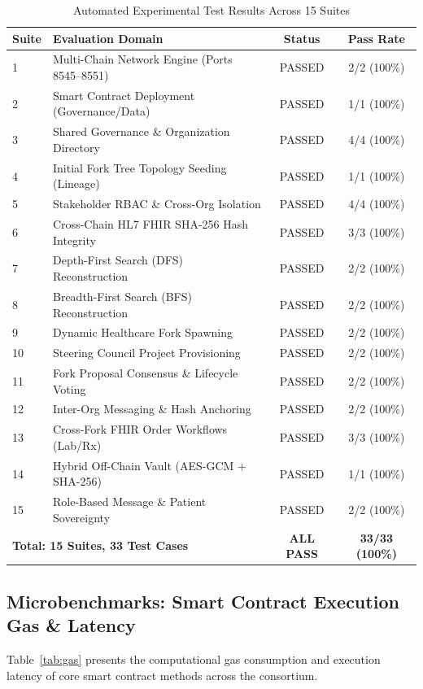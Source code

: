\documentclass[journal]{IEEEtran}
\theoremstyle{definition}
\begin{document}
\begin{table}[htbp]
\centering
\caption{Automated Experimental Test Results Across 15 Suites}
\label{tab:eval}
\begin{tabular}{llcc}
\toprule
\textbf{Suite} & \textbf{Evaluation Domain} & \textbf{Status} & \textbf{Pass Rate} \\
\midrule
1  & Multi-Chain Network Engine (Ports 8545--8551) & PASSED & 2/2 (100\%) \\
2  & Smart Contract Deployment (Governance/Data)   & PASSED & 1/1 (100\%) \\
3  & Shared Governance \& Organization Directory   & PASSED & 4/4 (100\%) \\
4  & Initial Fork Tree Topology Seeding (Lineage)  & PASSED & 1/1 (100\%) \\
5  & Stakeholder RBAC \& Cross-Org Isolation       & PASSED & 4/4 (100\%) \\
6  & Cross-Chain HL7 FHIR SHA-256 Hash Integrity   & PASSED & 3/3 (100\%) \\
7  & Depth-First Search (DFS) Reconstruction       & PASSED & 2/2 (100\%) \\
8  & Breadth-First Search (BFS) Reconstruction     & PASSED & 2/2 (100\%) \\
9  & Dynamic Healthcare Fork Spawning              & PASSED & 2/2 (100\%) \\
10 & Steering Council Project Provisioning          & PASSED & 2/2 (100\%) \\
11 & Fork Proposal Consensus \& Lifecycle Voting   & PASSED & 2/2 (100\%) \\
12 & Inter-Org Messaging \& Hash Anchoring         & PASSED & 2/2 (100\%) \\
13 & Cross-Fork FHIR Order Workflows (Lab/Rx)      & PASSED & 3/3 (100\%) \\
14 & Hybrid Off-Chain Vault (AES-GCM + SHA-256)    & PASSED & 1/1 (100\%) \\
15 & Role-Based Message \& Patient Sovereignty     & PASSED & 2/2 (100\%) \\
\midrule
\multicolumn{2}{l}{\textbf{Total: 15 Suites, 33 Test Cases}} & \textbf{ALL PASS} & \textbf{33/33 (100\%)} \\
\bottomrule
\end{tabular}
\end{table}

\subsection{Microbenchmarks: Smart Contract Execution Gas & Latency}
Table~\ref{tab:gas} presents the computational gas consumption and execution latency of core smart contract methods across the consortium.
\end{document}
